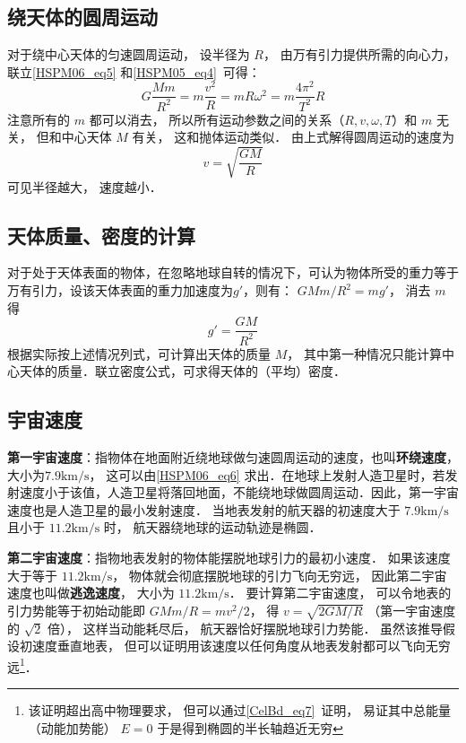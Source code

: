 \subsection{绕天体的圆周运动}

对于绕中心天体的匀速圆周运动， 设半径为 $R$， 由万有引力提供所需的向心力， 联立\autoref{HSPM06_eq5} 和\autoref{HSPM05_eq4}~可得：
\begin{equation}
G\frac{Mm}{R^2}=m\frac{v^2}{R}=mR\omega^2=m\frac{4\pi^2}{T^2}R
\end{equation}
注意所有的 $m$ 都可以消去， 所以所有运动参数之间的关系（$R,v,\omega,T$）和 $m$ 无关， 但和中心天体 $M$ 有关， 这和抛体运动类似． 由上式解得圆周运动的速度为
\begin{equation}\label{HSPM06_eq6}
v = \sqrt{\frac{GM}{R}}
\end{equation}
可见半径越大， 速度越小．

\subsection{天体质量、密度的计算}

对于处于天体表面的物体，在忽略地球自转的情况下，可认为物体所受的重力等于万有引力，设该天体表面的重力加速度为$g'$，则有： $GMm/R^2=mg'$， 消去 $m$ 得
\begin{equation}
g' = \frac{GM}{R^2}
\end{equation}
根据实际按上述情况列式，可计算出天体的质量 $M$， 其中第一种情况只能计算中心天体的质量．联立密度公式，可求得天体的（平均）密度．

\subsection{宇宙速度}

\textbf{第一宇宙速度}：指物体在地面附近绕地球做匀速圆周运动的速度，也叫\textbf{环绕速度}，大小为$7.9\mathrm{km/s}$， 这可以由\autoref{HSPM06_eq6} 求出．在地球上发射人造卫星时，若发射速度小于该值，人造卫星将落回地面，不能绕地球做圆周运动．因此，第一宇宙速度也是人造卫星的最小发射速度． 当地表发射的航天器的初速度大于 $7.9\mathrm{km/s}$ 且小于 $11.2\mathrm{km/s}$ 时， 航天器绕地球的运动轨迹是椭圆．

\textbf{第二宇宙速度}：指物地表发射的物体能摆脱地球引力的最初小速度． 如果该速度大于等于 $11.2\mathrm{km/s}$， 物体就会彻底摆脱地球的引力飞向无穷远， 因此第二宇宙速度也叫做\textbf{逃逸速度}， 大小为 $11.2\mathrm{km/s}$． 要计算第二宇宙速度， 可以令地表的引力势能等于初始动能即 $GMm/R = mv^2/2$， 得 $v = \sqrt{2GM/R}$ （第一宇宙速度的 $\sqrt{2}$ 倍）， 这样当动能耗尽后， 航天器恰好摆脱地球引力势能． 虽然该推导假设初速度垂直地表， 但可以证明用该速度以任何角度从地表发射都可以飞向无穷远\footnote{该证明超出高中物理要求， 但可以通过\autoref{CelBd_eq7}~证明， 易证其中总能量（动能加势能） $E = 0$ 于是得到椭圆的半长轴趋近无穷}．

